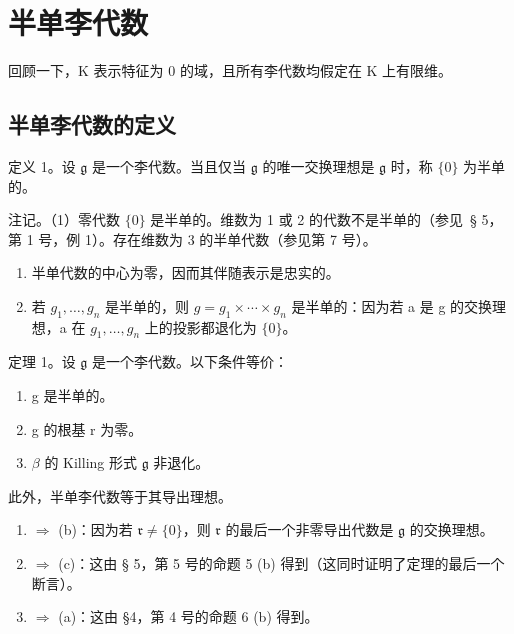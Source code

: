 \section{半单李代数}

回顾一下，K 表示特征为 0 的域，且所有李代数均假定在 K 上有限维。

\subsection{半单李代数的定义}

定义 1。设 \(\mathfrak{g}\) 是一个李代数。当且仅当 \(\mathfrak{g}\) 的唯一交换理想是 \(\mathfrak{g}\) 时，称 \(\{0\}\) 为半单的。

注记。（1）零代数 \(\{0\}\) 是半单的。维数为 1 或 2 的代数不是半单的（参见~§ 5，第 1 号，例 1）。存在维数为 3 的半单代数（参见第 7 号）。

\begin{enumerate}
\def\labelenumi{(\arabic{enumi})}
\setcounter{enumi}{1}
\item
  半单代数的中心为零，因而其伴随表示是忠实的。
\item
  若 \(g_{1}, \ldots, g_{n}\) 是半单的，则 \(g = g_{1} \times \cdots \times g_{n}\) 是半单的：因为若 a 是 g 的交换理想，a 在 \(g_{1}, \ldots, g_{n}\) 上的投影都退化为 \(\{0\}\)。
\end{enumerate}

定理 1。设 \(\mathfrak{g}\) 是一个李代数。以下条件等价：

\begin{enumerate}
\def\labelenumi{(\alph{enumi})}
\item
  g 是半单的。
\item
  g 的根基 r 为零。
\item
  \(\beta\) 的 Killing 形式 \(\mathfrak{g}\) 非退化。
\end{enumerate}

此外，半单李代数等于其导出理想。

\begin{enumerate}
\def\labelenumi{(\alph{enumi})}
\item
  \(\Rightarrow\) (b)：因为若 \(\mathfrak{r} \neq \{0\}\)，则 \(\mathfrak{r}\) 的最后一个非零导出代数是 \(\mathfrak{g}\) 的交换理想。
\item
  \(\Rightarrow\) (c)：这由 § 5，第 5 号的命题 5 (b) 得到（这同时证明了定理的最后一个断言）。
\item
  \(\Rightarrow\) (a)：这由 §4，第 4 号的命题 6 (b) 得到。
\end{enumerate}

